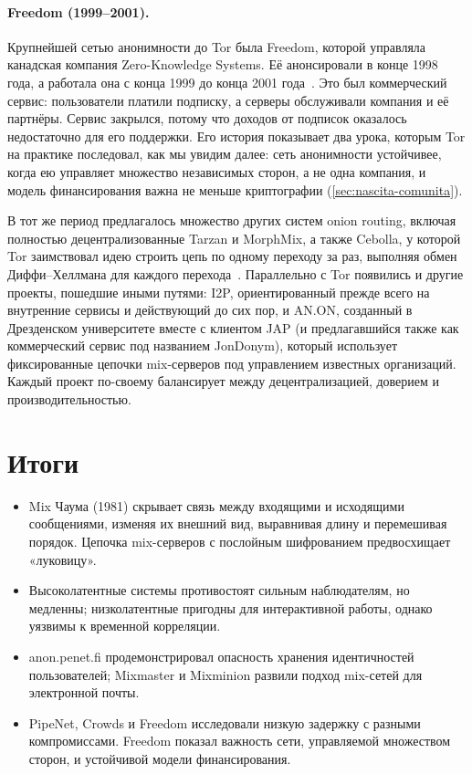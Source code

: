 \paragraph{Freedom (1999--2001).} Крупнейшей сетью анонимности до Tor была Freedom, которой управляла канадская компания Zero-Knowledge Systems. Её анонсировали в конце 1998 года, а работала она с конца 1999 до конца 2001 года~\cite{syverson2011peel}. Это был коммерческий сервис: пользователи платили подписку, а серверы обслуживали компания и её партнёры. Сервис закрылся, потому что доходов от подписок оказалось недостаточно для его поддержки. Его история показывает два урока, которым Tor на практике последовал, как мы увидим далее: сеть анонимности устойчивее, когда ею управляет множество независимых сторон, а не одна компания, и модель финансирования важна не меньше криптографии (\cref{sec:nascita-comunita}).

\begin{approfondimento}
В тот же период предлагалось множество других систем onion routing, включая полностью децентрализованные Tarzan и MorphMix, а также Cebolla, у которой Tor заимствовал идею строить цепь по одному переходу за раз, выполняя обмен Диффи--Хеллмана для каждого перехода~\cite{syverson2011peel}. Параллельно с Tor появились и другие проекты, пошедшие иными путями: I2P, ориентированный прежде всего на внутренние сервисы и действующий до сих пор, и AN.ON, созданный в Дрезденском университете вместе с клиентом JAP (и предлагавшийся также как коммерческий сервис под названием JonDonym), который использует фиксированные цепочки mix-серверов под управлением известных организаций. Каждый проект по-своему балансирует между децентрализацией, доверием и производительностью.
\end{approfondimento}

\section*{Итоги}
\begin{itemize}
  \item Mix Чаума (1981) скрывает связь между входящими и исходящими сообщениями, изменяя их внешний вид, выравнивая длину и перемешивая порядок. Цепочка mix-серверов с послойным шифрованием предвосхищает «луковицу».
  \item Высоколатентные системы противостоят сильным наблюдателям, но медленны; низколатентные пригодны для интерактивной работы, однако уязвимы к временной корреляции.
  \item anon.penet.fi продемонстрировал опасность хранения идентичностей пользователей; Mixmaster и Mixminion развили подход mix-сетей для электронной почты.
  \item PipeNet, Crowds и Freedom исследовали низкую задержку с разными компромиссами. Freedom показал важность сети, управляемой множеством сторон, и устойчивой модели финансирования.
\end{itemize}

